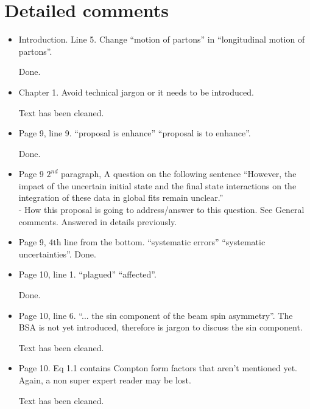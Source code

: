 \section*{Detailed comments} 


 \begin{itemize}
 
  \item Introduction. Line 5. Change ``motion of partons'' in ``longitudinal motion of partons''.

     {\color{red} Done.}
  
  \item Chapter 1. Avoid technical jargon or it needs to be introduced.
       
     {\color{red} Text has been cleaned.}
  
  \item Page 9, line 9. ``proposal is enhance'' \rarr ``proposal is to enhance''.
     
     {\color{red} Done.}
    
  \item  Page 9 $2^{nd}$ paragraph, A question on the following sentence  
     ``However, the impact of the uncertain initial state and the final state 
       interactions on the integration of these data in global fits remain 
       unclear.'' \\
  - How this proposal is going to address/answer to this question. See General comments.
     {\color{red} Answered in details previously.}

  \item Page 9,  4th line from the bottom. ``systematic errors'' \rarr ``systematic uncertainties''.
     {\color{red} Done.}
  
  \item Page 10, line 1. ``plagued'' \rarr ``affected''.
     
     {\color{red} Done.}
  
  \item Page 10, line 6. ``... the sin component of the beam spin asymmetry''.  
     The BSA is not yet introduced, therefore is jargon to discuss the sin 
       component.
     
       {\color{red} Text has been cleaned.}
  
  \item Page 10. Eq 1.1 contains Compton form factors that aren't mentioned 
     yet. Again, a non super expert reader may be lost.
     
       {\color{red} Text has been cleaned.}
  

\end{itemize}
